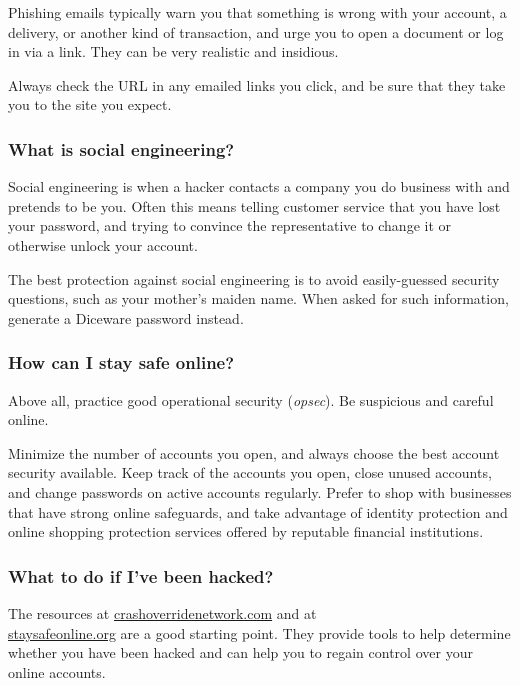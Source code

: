 Phishing emails typically warn you that something is wrong with your account, a delivery, or another kind of transaction, and urge you to open a document or log in via a link. They can be very realistic and insidious.

Always check the URL in any emailed links you click, and be sure that they take you to the site you expect.

\subsubsection{What is social engineering?}

Social engineering is when a hacker contacts a company you do business with and pretends to be you. Often this means telling customer service that you have lost your password, and trying to convince the representative to change it or otherwise unlock your account.

The best protection against social engineering is to avoid easily-guessed security questions, such as your mother's maiden name. When asked for such information, generate a Diceware password instead.

\subsubsection{How can I stay safe online?}

Above all, practice good operational security (\textit{opsec}). Be suspicious and careful online. 

Minimize the number of accounts you open, and always choose the best account security available. Keep track of the accounts you open, close unused accounts, and change passwords on active accounts regularly. Prefer to shop with businesses that have strong online safeguards, and take advantage of identity protection and online shopping protection services offered by reputable financial institutions.

\subsubsection{What to do if I've been hacked?}

The resources at \url{crashoverridenetwork.com} and at \\  \url{staysafeonline.org} are a good starting point. They provide tools to help determine whether you have been hacked and can help you to regain control over your online accounts.
